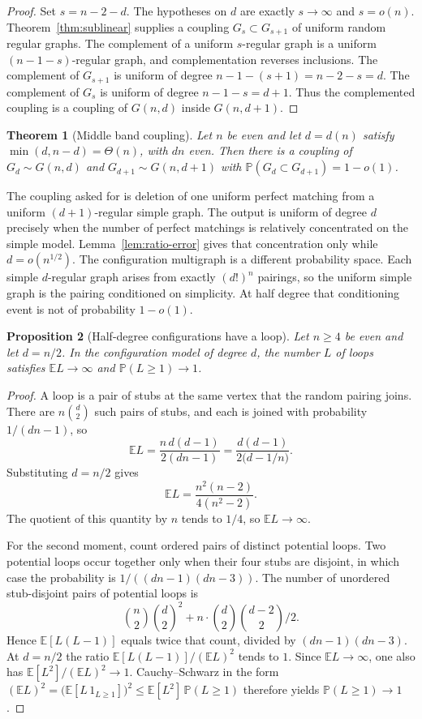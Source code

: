 \documentclass[11pt]{article}
\newtheorem{theorem}{Theorem}
\newtheorem{proposition}[theorem]{Proposition}
\newcommand{\Gnd}{G(n,d)}
\newcommand{\EE}{\mathbb{E}}
\newcommand{\PP}{\mathbb{P}}
\begin{document}
\begin{proof}
Set \(s=n-2-d\). The hypotheses on \(d\) are exactly \(s\to\infty\) and \(s=o(n)\).
Theorem~\ref{thm:sublinear} supplies a coupling \(G_s\subset G_{s+1}\) of uniform
random regular graphs. The complement of a uniform \(s\)-regular graph is a
uniform \((n-1-s)\)-regular graph, and complementation reverses inclusions.
The complement of \(G_{s+1}\) is uniform of degree \(n-1-(s+1)=n-2-s=d\).
The complement of \(G_s\) is uniform of degree \(n-1-s=d+1\).
Thus the complemented coupling is a coupling of \(G(n,d)\) inside \(G(n,d+1)\).
\end{proof}

\begin{theorem}[Middle band coupling]
\label{thm:middle}
Let \(n\) be even and let \(d=d(n)\) satisfy \(\min(d,n-d)=\Theta(n)\), with \(dn\) even.
Then there is a coupling of \(G_d\sim\Gnd\) and \(G_{d+1}\sim G(n,d+1)\) with
\(\PP(G_d\subset G_{d+1})=1-o(1)\).
\end{theorem}

The coupling asked for is deletion of one uniform perfect matching from a uniform
\((d+1)\)-regular simple graph. The output is uniform of degree \(d\) precisely when
the number of perfect matchings is relatively concentrated on the simple model.
Lemma~\ref{lem:ratio-error} gives that concentration only while \(d=o(n^{1/2})\).
The configuration multigraph is a different probability space.
Each simple \(d\)-regular graph arises from exactly \((d!)^n\) pairings, so the
uniform simple graph is the pairing conditioned on simplicity.
At half degree that conditioning event is not of probability \(1-o(1)\).

\begin{proposition}[Half-degree configurations have a loop]
\label{prop:config-loops}
Let \(n\ge 4\) be even and let \(d=n/2\). In the configuration model of degree \(d\),
the number \(L\) of loops satisfies \(\EE L\to\infty\) and \(\PP(L\ge 1)\to 1\).
\end{proposition}

\begin{proof}
A loop is a pair of stubs at the same vertex that the random pairing joins.
There are \(n\binom{d}{2}\) such pairs of stubs, and each is joined with probability
\(1/(dn-1)\), so
\[
\EE L
=
\frac{n\,d(d-1)}{2(dn-1)}
=
\frac{d(d-1)}{2\bigl(d-1/n\bigr)}.
\]
Substituting \(d=n/2\) gives
\[
\EE L
=
\frac{n^2(n-2)}{4(n^2-2)}.
\]
The quotient of this quantity by \(n\) tends to \(1/4\), so \(\EE L\to\infty\).

For the second moment, count ordered pairs of distinct potential loops.
Two potential loops occur together only when their four stubs are disjoint, in which
case the probability is \(1/((dn-1)(dn-3))\).
The number of unordered stub-disjoint pairs of potential loops is
\[
\binom{n}{2}\binom{d}{2}^2
+
n\cdot\binom{d}{2}\binom{d-2}{2}/2.
\]
Hence \(\EE[L(L-1)]\) equals twice that count, divided by \((dn-1)(dn-3)\).
At \(d=n/2\) the ratio \(\EE[L(L-1)]/(\EE L)^2\) tends to \(1\).
Since \(\EE L\to\infty\), one also has \(\EE[L^2]/(\EE L)^2\to 1\).
Cauchy--Schwarz in the form
\((\EE L)^2=\bigl(\EE[L\,1_{L\ge 1}]\bigr)^2\le\EE[L^2]\,\PP(L\ge 1)\)
therefore yields \(\PP(L\ge 1)\to 1\).
\end{proof}
\end{document}
